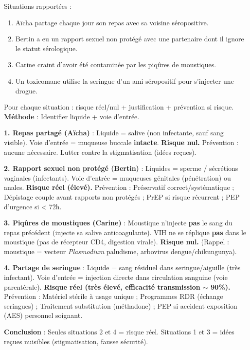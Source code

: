 \documentclass[11pt]{article}
\begin{document}
\begin{exoresolu}
Situations rapportées :
\begin{enumerate}
\item Aïcha partage chaque jour son repas avec sa voisine séropositive.
\item Bertin a eu un rapport sexuel non protégé avec une partenaire dont il ignore le statut sérologique.
\item Carine craint d'avoir été contaminée par les piqûres de moustiques.
\item Un toxicomane utilise la seringue d'un ami séropositif pour s'injecter une drogue.
\end{enumerate}
Pour chaque situation : risque réel/nul + justification + prévention si risque.
\tcblower
\textbf{Méthode} : Identifier liquide + voie d'entrée.

\textbf{1. Repas partagé (Aïcha)} : Liquide = salive (non infectante, sauf sang visible). Voie d'entrée = muqueuse buccale \textbf{intacte}. \textbf{Risque nul.} Prévention : aucune nécessaire. Lutter contre la stigmatisation (idées reçues).

\textbf{2. Rapport sexuel non protégé (Bertin)} : Liquides = sperme / sécrétions vaginales (infectants). Voie d'entrée = muqueuses génitales (pénétration) ou anales. \textbf{Risque réel (élevé).} Prévention : Préservatif correct/systématique ; Dépistage couple avant rapports non protégés ; PrEP si risque récurrent ; PEP d'urgence si < 72h.

\textbf{3. Piqûres de moustiques (Carine)} : Moustique n'injecte \textbf{pas} le sang du repas précédent (injecte sa salive anticoagulante). VIH ne se réplique \textbf{pas} dans le moustique (pas de récepteur CD4, digestion virale). \textbf{Risque nul.} (Rappel : moustique = vecteur \emph{Plasmodium} paludisme, arbovirus dengue/chikungunya).

\textbf{4. Partage de seringue} : Liquide = sang résiduel dans seringue/aiguille (très infectant). Voie d'entrée = injection directe dans circulation sanguine (voie parentérale). \textbf{Risque réel (très élevé, efficacité transmission $\sim$ 90\%).} Prévention : Matériel stérile à usage unique ; Programmes RDR (échange seringues) ; Traitement substitution (méthadone) ; PEP si accident exposition (AES) personnel soignant.

\textbf{Conclusion} : Seules situations 2 et 4 = risque réel. Situations 1 et 3 = idées reçues nuisibles (stigmatisation, fausse sécurité).
\end{exoresolu}
\end{document}
